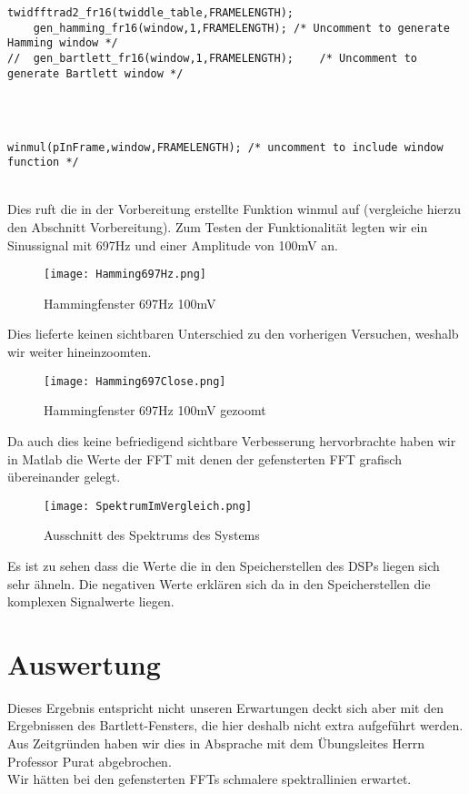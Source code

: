 \begin{adjustbox}{width=\textwidth, keepaspectratio} 
  \label{code:procdataKompFIR}
  \begin{lstlisting}[title=Codeausschnitt der modifizierten main.c]
	twidfftrad2_fr16(twiddle_table,FRAMELENGTH);
	gen_hamming_fr16(window,1,FRAMELENGTH);	/* Uncomment to generate Hamming window */
//	gen_bartlett_fr16(window,1,FRAMELENGTH);	/* Uncomment to generate Bartlett window */
	
\end{lstlisting}
\end{adjustbox}\\
\begin{adjustbox}{width=\textwidth, keepaspectratio} 
  \label{code:procdataKompFIR}
  \begin{lstlisting}[title=Codeausschnitt der modifizierten process\_data.c]
	winmul(pInFrame,window,FRAMELENGTH); /* uncomment to include window function */
\end{lstlisting}
\end{adjustbox}\\
Dies ruft die in der Vorbereitung erstellte Funktion winmul auf (vergleiche hierzu den Abschnitt Vorbereitung).
Zum Testen der Funktionalität legten wir ein Sinussignal mit 697Hz und einer Amplitude von 100mV an. 
\begin{figure}[H]
  \centering
    \texttt{[image: Hamming697Hz.png]}
  \caption{Hammingfenster 697Hz 100mV}
  \label{fig:Hamming697Hz}
\end{figure}
Dies lieferte keinen sichtbaren Unterschied zu den vorherigen Versuchen, weshalb wir weiter hineinzoomten.
\begin{figure}[H]
  \centering
    \texttt{[image: Hamming697Close.png]}
  \caption{Hammingfenster 697Hz 100mV gezoomt}
  \label{fig:Hamming697Close}
\end{figure}
Da auch dies keine befriedigend sichtbare Verbesserung hervorbrachte haben wir in Matlab die Werte der FFT mit denen der gefensterten FFT grafisch übereinander gelegt.
\begin{figure}[H]
  \centering
    \texttt{[image: SpektrumImVergleich.png]}
  \caption{Ausschnitt des Spektrums des Systems}
  \label{fig:SpektrumImVergleich}
\end{figure}
Es ist zu sehen dass die Werte die in den Speicherstellen des DSPs liegen sich sehr ähneln. Die negativen Werte erklären sich da in den Speicherstellen die komplexen Signalwerte liegen.

\section{Auswertung}\label{AFFTmF}
Dieses Ergebnis entspricht nicht unseren Erwartungen deckt sich aber mit den Ergebnissen des Bartlett-Fensters, die hier deshalb nicht extra aufgeführt werden. \\
Aus Zeitgründen haben wir dies in Absprache mit dem Übungsleites Herrn Professor Purat abgebrochen.\\
Wir hätten bei den gefensterten FFTs schmalere spektrallinien erwartet.